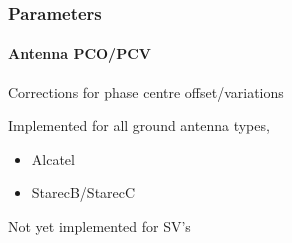 \documentclass{beamer}
\begin{document}
\begin{frame}\frametitle{Parameters}\framesubtitle{Antenna PCO/PCV}
    Corrections for phase centre offset/variations\\
    \vspace{.3cm}

  Implemented for all ground antenna types,
  \begin{itemize}
      \item Alcatel
      \item StarecB/StarecC
  \end{itemize}
  \vspace{.3cm}

  Not yet implemented for SV's
  \vspace{.3cm}

\end{frame}


\end{document}
